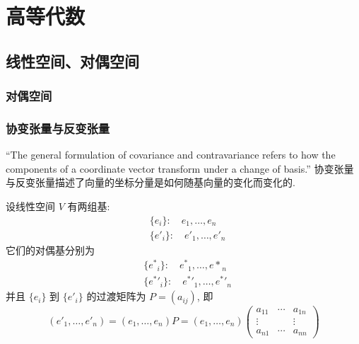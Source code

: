 \chapter{高等代数}
\section{线性空间、对偶空间}
    \subsection{对偶空间}

    \subsection{协变张量与反变张量}

    “The general formulation of covariance and contravariance refers to 
    how the components of a coordinate vector transform under a change of basis.”
    协变张量与反变张量描述了向量的坐标分量是如何随基向量的变化而变化的.

    设线性空间 $V$ 有两组基:
    \begin{align*}
        &\{e_i\}:\quad e_1,\dots,e_n \\
        &\{{e}'_i\}:\quad {e'}_1,\dots,{e'}_n
    \end{align*}
    它们的对偶基分别为
    \begin{align*}
        &\{{e^*}_i\}:\quad {e^*}_1,\dots,{e*}_n \\
        &\{{e^*}'_i\}:\quad {e^*}'_1,\dots,{e^*}'_n
    \end{align*}
    并且 $\{e_i\}$ 到 $\{{e}'_i\}$ 的过渡矩阵为 $P = (a_{ij})$, 即
    \begin{equation*}
        ({e'}_1,\dots,{e'}_n) = (e_1,\dots,e_n)P = (e_1,\dots,e_n)
        \begin{pmatrix}
            a_{11} & \cdots & a_{1n} \\
            \vdots & & \vdots \\
            a_{n1} & \cdots & a_{nn}
        \end{pmatrix}
    \end{equation*}

